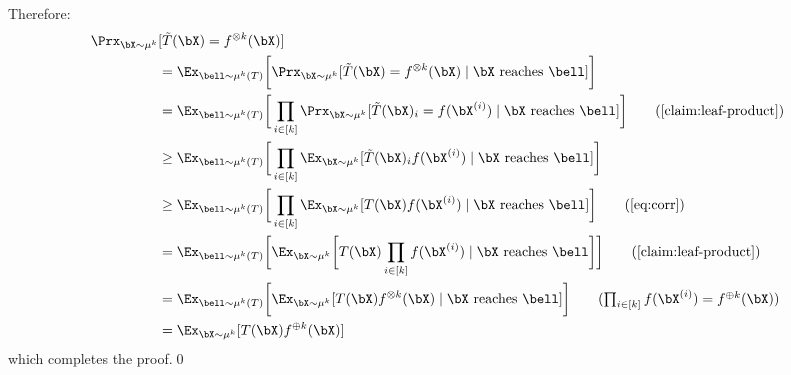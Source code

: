 Therefore:
    \begin{align*}
    \Prx_{\bX \sim \mu^{k}}&[\tilde{T}(\bX)= f^{\otimes k}(\bX)]\\
        &= \Ex_{\bell\sim\mu^{k}(T)}\bigg[\Prx_{\bX\sim\mu^{k}}[\tilde{T}(\bX)=f^{\otimes k}(\bX)\mid \bX\text{ reaches }\bell]\bigg]\\
        &=\Ex_{\bell\sim\mu^{k}(T)}\bigg[\prod_{i\in [k]}\Prx_{\bX\sim\mu^{k}}[\tilde{T}(\bX)_i=f(\bX^{(i)})\mid \bX\text{ reaches }\bell]\bigg]\tag{\Cref{claim:leaf-product}}\\
        &\ge \Ex_{\bell\sim\mu^{k}(T)}\bigg[\prod_{i\in [k]}\Ex_{\bX\sim\mu^{k}}[\Tilde{T}(\bX)_if(\bX^{(i)})\mid \bX\text{ reaches }\bell]\bigg]\\
        &\ge \Ex_{\bell\sim\mu^{k}(T)}\bigg[\prod_{i\in [k]}\Ex_{\bX\sim\mu^{k}}[T(\bX)f(\bX^{(i)})\mid \bX\text{ reaches }\bell]\bigg]\tag{\Cref{eq:corr}}\\
        &=\Ex_{\bell\sim\mu^{k}(T)}\bigg[\Ex_{\bX\sim\mu^{k}}\bigg[T(\bX)\prod_{i\in [k]}f(\bX^{(i)})\mid \bX\text{ reaches }\bell\bigg]\bigg]\tag{\Cref{claim:leaf-product}}\\
        &=\Ex_{\bell\sim\mu^{k}(T)}\bigg[\Ex_{\bX\sim\mu^{k}}[T(\bX)f^{\otimes k}(\bX)\mid \bX\text{ reaches }\bell]\bigg]\tag{$\prod_{i\in [k]}f(\bX^{(i)})=f^{\oplus k}(\bX)$}\\
        &=\Ex_{\bX \sim \mu^{k}}[T(\bX)f^{\oplus k}(\bX)]
    \end{align*}
    which completes the proof.\hfill\qed



